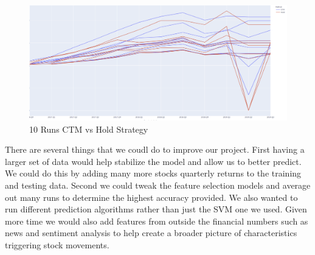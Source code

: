 \documentclass[conference]{IEEEtran}
\begin{document}
\begin{figure}
  \includegraphics[width=\linewidth]{FinalResultstop3of4slots.png}
  \caption{10 Runs CTM vs Hold Strategy}
  \label{finalresults}
\end{figure}

There are several things that we coudl do to improve our project.  First having a larger set of data would help stabilize the model and allow us to better predict.  We could do this by adding many more stocks quarterly returns to the training and testing data.  Second we could tweak the feature selection models and average out many runs to determine the highest accuracy provided.  We also wanted to run different prediction algorithms rather than just the SVM one we used.  Given more time we would also add features from outside the financial numbers such as news and sentiment analysis to help create a broader picture of characteristics triggering stock movements.






\vspace{12pt}
\end{document}

